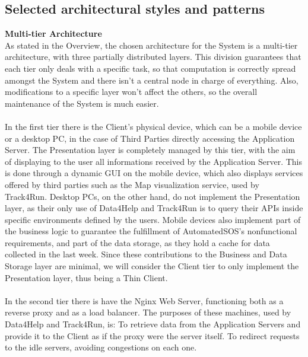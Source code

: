 \documentclass[titlepage]{article}
\begin{document}
\vspace{\baselineskip}

\pagebreak



\subsection{Selected architectural styles and patterns}

{\bf Multi-tier Architecture }\\ 
As stated in the Overview, the chosen architecture for the System is a multi-tier architecture, with three partially distributed layers. This division guarantees that each tier only deals with a specific task, so that computation is correctly spread amongst the System and there isn’t a central node in charge of everything. Also, modifications to a specific layer won’t affect the others, so the overall maintenance of the System is much easier.\\ \\
In the first tier there is the Client’s physical device, which can be a mobile device or a desktop PC, in the case of Third Parties directly accessing the Application Server.
The Presentation layer is completely managed by this tier, with the aim of displaying to the user all informations received by the Application Server. This is done through a dynamic GUI on the mobile device, which also displays services offered by third parties such as the Map visualization service, used by Track4Run. Desktop PCs, on the other hand, do not implement the Presentation layer, as their only use of Data4Help and Track4Run is to query their APIs inside specific environments defined by the users.
Mobile devices also implement part of the business logic to guarantee the fulfillment of AutomatedSOS's nonfunctional requirements, and part of the data storage, as they hold a cache for data collected in the last week. Since these contributions to the Business and Data Storage layer are minimal, we will consider the Client tier to only implement the Presentation layer, thus being a Thin Client.\\ \\
In the second tier there is have the Nginx Web Server, functioning both as a reverse proxy and as a load balancer. The purposes of these machines, used by Data4Help and Track4Run, is:
To retrieve data from the Application Servers and provide it to the Client as if the proxy were the server itself.
To redirect requests to the idle servers, avoiding congestions on each one.
\end{document}
